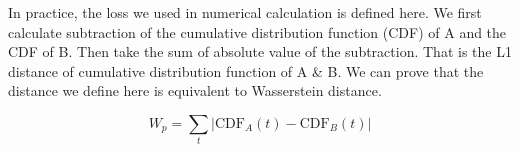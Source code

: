 In practice, the loss we used in numerical calculation is defined here. We first calculate subtraction of the cumulative distribution function (CDF) of A and the CDF of B. Then take the sum of absolute value of the subtraction. That is the L1 distance of cumulative distribution function of A \& B. We can prove that the distance we define here is equivalent to Wasserstein distance. 

\begin{equation}
    W_{p}=\sum_t|\mathrm{CDF}_A(t) - \mathrm{CDF}_B(t)|
\end{equation}
